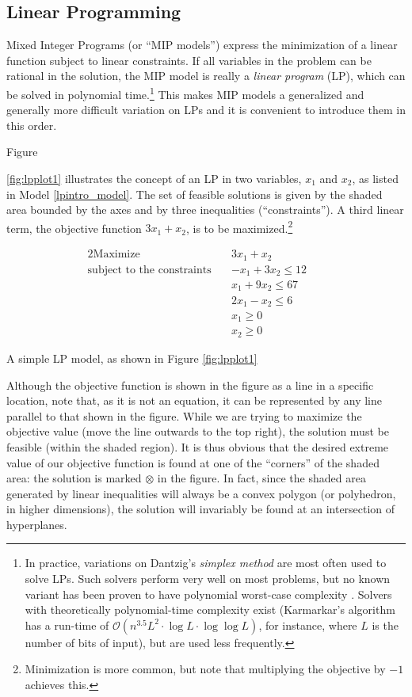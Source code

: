 \documentclass[13pt, letterpaper, oneside]{book}
\begin{document}
\subsection{Linear Programming}
Mixed Integer Programs (or ``MIP
models'') express the minimization of a linear function subject to linear
constraints. If all variables in the problem can be rational in the solution,
the MIP model is really a \textit{linear program} (LP), which can be solved in
polynomial time.\footnote{In practice, variations on Dantzig's \textit{simplex
method} are most often used to solve LPs. Such solvers perform very well on most
problems, but no known variant has been proven to have polynomial worst-case
complexity \citep{papadimitriou}. Solvers with theoretically polynomial-time
complexity exist (Karmarkar's algorithm \citep{karmarkar} has a run-time of
$\mathcal{O}(n^{3.5}L^2 \cdot \log L \cdot \log \log L)$, for instance, where
$L$ is the number of bits of input), but are used less frequently.} This makes
MIP models a generalized and generally more difficult variation on LPs and it is
convenient to introduce them in this order. 

Figure

\ref{fig:lpplot1} illustrates the concept of an LP in two variables, $x_1$ and
$x_2$, as listed in Model \ref{lpintro_model}. The set of feasible solutions is given by the shaded area bounded by the axes
and by three inequalities (``constraints''). A third linear term, the objective
function $3x_1 + x_2$, is to be maximized.\footnote{Minimization is more common,
but note that multiplying the objective by $-1$ achieves this.} 
\begin{model}
\begin{alignat}{2}
\text{Maximize}\quad & 3x_1 + x_2 && \\
\text{subject to the constraints}\quad & -x_1 + 3x_2 \leq 12 &&\\
& x_1 + 9x_2 \leq 67 && \\
& 2x_1 - x_2 \leq 6 && \\
& x_1 \geq 0 && \\
& x_2 \geq 0 && 
\end{alignat}
\caption{A simple LP model, as shown in Figure \ref{fig:lpplot1}}
\label{lpintro_model}
\end{model}

Although the objective function is shown in the figure as a line in a specific
location, note that, as it is not an equation, it can be represented by any line
parallel to that shown in the figure. While we are trying to maximize the
objective value (move the line outwards to the top right), the solution must be
feasible (within the shaded region). It is thus obvious
that the desired extreme value of our objective function is found at one of the
``corners'' of the shaded area: the solution is marked $\otimes$ in the figure.
In fact, since the shaded area generated by linear inequalities will always be a
convex polygon (or polyhedron, in higher dimensions), the solution will
invariably be found at an intersection of hyperplanes.
\end{document}
